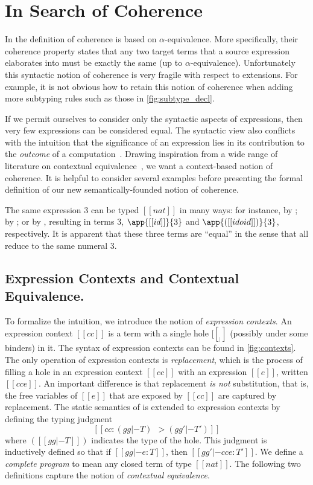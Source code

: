 \section{In Search of Coherence}

In \oname the definition of coherence is based on
$\alpha$-equivalence. More specifically, their coherence property states that
any two target terms that a source expression elaborates into must be exactly the same (up to
$\alpha$-equivalence). Unfortunately this syntactic notion of coherence is
very fragile with respect to extensions.
For example, it is not obvious how to retain this notion of coherence when adding more subtyping
rules such as those in \cref{fig:subtype_decl}.

If we permit ourselves to consider only the syntactic aspects of expressions,
then very few expressions can be considered equal. The syntactic view also conflicts
with the intuition that the significance of an expression lies in its
contribution to the \textit{outcome} of a computation~\citep{Harper_2016}.
Drawing inspiration from a wide range of literature on contextual
equivalence~\citep{morris1969lambda}, we want a context-based notion of
coherence. It is helpful to consider several examples before presenting the
formal definition of our new semantically-founded notion of coherence.

\begin{example} \label{eg:1}
The same \namee expression $3$ can be typed $[[nat]]$ in many ways: for instance, by ; by
; or by , resulting in \tname
terms $3$, $\app{[[id]]}{3}$ and $\app{([[id o id]])}{3}$, respectively. It is apparent
that these three \tname terms are ``equal'' in the sense that all reduce to the
same numeral $3$.
\end{example}

\subsection{Expression Contexts and Contextual Equivalence.}

To formalize the intuition, we introduce the notion of \textit{expression
  contexts}. An expression context $[[cc]]$ is a term with a single hole
$[[__]]$ (possibly under some binders) in it. The syntax of \tname expression
contexts can be found in \cref{fig:contexts}. The only operation of expression
contexts is \textit{replacement}, which is the process of filling a hole in an
expression context $[[cc]]$ with an expression $[[e]]$, written $[[ cc{e} ]]$.
An important difference is that replacement \textit{is not} substitution, that
is, the free variables of $[[e]]$ that are exposed by $[[cc]]$ are captured by
replacement. The static semantics of \tname is extended to expression contexts
by defining the typing judgment
\[
  [[cc : (gg |- T) ~~> (gg' |- T')]]
\]
where $([[gg |- T]])$ indicates the type of the hole. This judgment is
inductively defined so that if $[[gg |- e : T]]$, then $[[gg' |- cc{e} : T']]$.
We define a \textit{complete program} to mean any closed term of type $[[nat]]$.
The following two definitions capture
the notion of \textit{contextual equivalence}.

